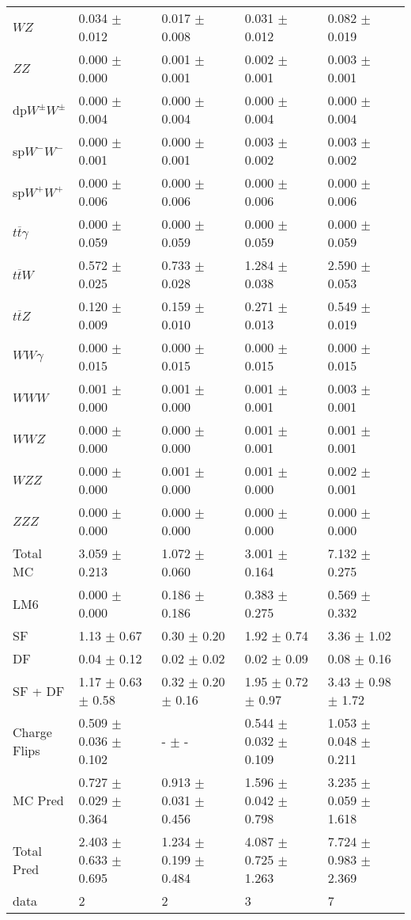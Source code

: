 \begin{tabular}{l | l l l l}
$WZ$ &  0.034 $\pm$  0.012 &  0.017 $\pm$  0.008 &  0.031 $\pm$  0.012 &  0.082 $\pm$  0.019\\
$ZZ$ &   0.000 $\pm$   0.000 &  0.001 $\pm$  0.001 &  0.002 $\pm$  0.001 &  0.003 $\pm$  0.001\\
\hline
dp$W^{\pm}W^{\pm}$ &  0.000 $\pm$  0.004 &  0.000 $\pm$  0.004 &  0.000 $\pm$  0.004 &  0.000 $\pm$  0.004\\
sp$W^{-}W^{-}$ &  0.000 $\pm$  0.001 &  0.000 $\pm$  0.001 &  0.003 $\pm$  0.002 &  0.003 $\pm$  0.002\\
sp$W^{+}W^{+}$ &  0.000 $\pm$  0.006 &  0.000 $\pm$  0.006 &  0.000 $\pm$  0.006 &  0.000 $\pm$  0.006\\
$t\overline{t}\gamma$ &  0.000 $\pm$  0.059 &  0.000 $\pm$  0.059 &  0.000 $\pm$  0.059 &  0.000 $\pm$  0.059\\
$t\overline{t}W$ &  0.572 $\pm$  0.025 &  0.733 $\pm$  0.028 &  1.284 $\pm$  0.038 &  2.590 $\pm$  0.053\\
$t\overline{t}Z$ &  0.120 $\pm$  0.009 &  0.159 $\pm$  0.010 &  0.271 $\pm$  0.013 &  0.549 $\pm$  0.019\\
$WW\gamma$ &  0.000 $\pm$  0.015 &  0.000 $\pm$  0.015 &  0.000 $\pm$  0.015 &  0.000 $\pm$  0.015\\
$WWW$ &  0.001 $\pm$   0.000 &  0.001 $\pm$   0.000 &  0.001 $\pm$  0.001 &  0.003 $\pm$  0.001\\
$WWZ$ &   0.000 $\pm$   0.000 &   0.000 $\pm$   0.000 &  0.001 $\pm$  0.001 &  0.001 $\pm$  0.001\\
$WZZ$ &   0.000 $\pm$   0.000 &  0.001 $\pm$   0.000 &  0.001 $\pm$   0.000 &  0.002 $\pm$  0.001\\
$ZZZ$ &   0.000 $\pm$   0.000 &   0.000 $\pm$   0.000 &   0.000 $\pm$   0.000 &   0.000 $\pm$   0.000\\
\hline
Total MC &  3.059 $\pm$  0.213 &  1.072 $\pm$  0.060 &  3.001 $\pm$  0.164 &  7.132 $\pm$  0.275\\
\hline\hline
\hline
LM6 &  0.000 $\pm$  0.000 &  0.186 $\pm$  0.186 &  0.383 $\pm$  0.275 &  0.569 $\pm$  0.332\\
\hline\hline
\hline\hline
 SF  & 1.13 $\pm$ 0.67 & 0.30 $\pm$ 0.20 & 1.92 $\pm$ 0.74 & 3.36 $\pm$ 1.02\\
 DF  & 0.04 $\pm$ 0.12 & 0.02 $\pm$ 0.02 & 0.02 $\pm$ 0.09 & 0.08 $\pm$ 0.16\\
\hline
 SF + DF  & 1.17 $\pm$ 0.63 $\pm$ 0.58 & 0.32 $\pm$ 0.20 $\pm$ 0.16 & 1.95 $\pm$ 0.72 $\pm$ 0.97 & 3.43 $\pm$ 0.98 $\pm$ 1.72\\
\hline\hline
Charge Flips & 0.509 $\pm$ 0.036 $\pm$ 0.102 & - $\pm$ - & 0.544 $\pm$ 0.032 $\pm$ 0.109 & 1.053 $\pm$ 0.048 $\pm$ 0.211\\
\hline\hline
\hline
MC Pred &  0.727 $\pm$  0.029 $\pm$  0.364 &  0.913 $\pm$  0.031 $\pm$  0.456 &  1.596 $\pm$  0.042 $\pm$  0.798 &  3.235 $\pm$  0.059 $\pm$  1.618\\
\hline\hline
Total Pred &  2.403 $\pm$  0.633 $\pm$  0.695 &  1.234 $\pm$  0.199 $\pm$  0.484 &  4.087 $\pm$  0.725 $\pm$  1.263 &  7.724 $\pm$  0.983 $\pm$  2.369\\
\hline\hline
data & 2 & 2 & 3 & 7\\
\hline\hline
\end{tabular}
